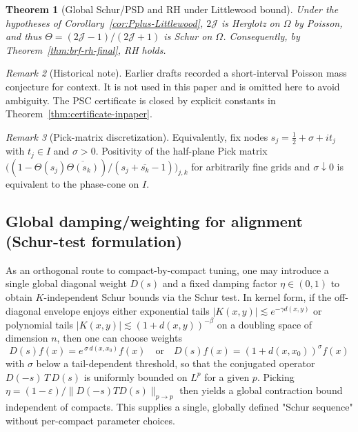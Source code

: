 \documentclass[11pt]{article}
\newtheorem{theorem}{Theorem}
\theoremstyle{definition}
\theoremstyle{remark}
\newtheorem{remark}[theorem]{Remark}
\begin{document}
\begin{theorem}[Global Schur/PSD and RH under Littlewood bound]\label{thm:global-RH-Littlewood}
Under the hypotheses of Corollary~\ref{cor:Pplus-Littlewood}, \(2\mathcal J\) is Herglotz on \(\Omega\) by Poisson, and thus \(\Theta=(2\mathcal J-1)/(2\mathcal J+1)\) is Schur on \(\Omega\). Consequently, by Theorem~\ref{thm:brf-rh-final}, RH holds.
\end{theorem}

\begin{remark}[Historical note]
Earlier drafts recorded a short-interval Poisson mass conjecture for context. It is not used in this paper and is omitted here to avoid ambiguity. The PSC certificate is closed by explicit constants in Theorem~\ref{thm:certificate-inpaper}.
\end{remark}

\begin{remark}[Pick-matrix discretization]\label{rem:pick-certificate}
Equivalently, fix nodes $s_j=\tfrac12+\sigma+i t_j$ with $t_j\in I$ and $\sigma>0$. Positivity of the half-plane Pick matrix \(\big((1-\Theta(s_j)\overline{\Theta(s_k)})/(s_j+\overline{s_k}-1)\big)_{j,k}\) for arbitrarily fine grids and $\sigma\downarrow 0$ is equivalent to the phase-cone on $I$.
\end{remark}

\subsection{Global damping/weighting for alignment (Schur-test formulation)}\label{subsec:global-damping}
As an orthogonal route to compact-by-compact tuning, one may introduce a single global diagonal weight \(D(s)\) and a fixed damping factor \(\eta\in(0,1)\) to obtain \(K\)-independent Schur bounds via the Schur test. In kernel form, if the off-diagonal envelope enjoys either exponential tails \(|K(x,y)|\lesssim e^{-\gamma d(x,y)}\) or polynomial tails \(|K(x,y)|\lesssim (1+d(x,y))^{-\beta}\) on a doubling space of dimension \(n\), then one can choose weights
\[
 D(s)f(x)=e^{\,\sigma\,d(x,x_0)}f(x)\quad\text{or}\quad D(s)f(x)=(1+d(x,x_0))^{\sigma} f(x)
\]
with \(\sigma\) below a tail-dependent threshold, so that the conjugated operator \(D(-s)\,T\,D(s)\) is uniformly bounded on \(L^p\) for a given \(p\). Picking \(\eta=(1-\varepsilon)/\|D(-s)TD(s)\|_{p\to p}\) then yields a global contraction bound independent of compacts. This supplies a single, globally defined "Schur sequence" without per-compact parameter choices.
\end{document}
